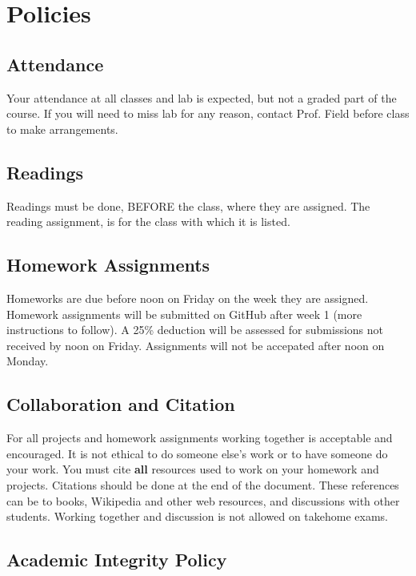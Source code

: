\documentclass[11pt]{article} %
\begin{document}
\section{Policies}

  \subsection{Attendance}
  
    Your attendance at all classes and lab is expected, but not a graded part of the course. If you will need to miss lab for any reason, contact Prof. Field before class to make arrangements.
  
  \subsection{Readings}
  
    Readings must be done, BEFORE the class, where they are assigned. 
    The reading assignment, is for the class with which it is listed. 
  
  \subsection{Homework Assignments}
  
    Homeworks are due before noon on Friday on the week they are assigned.
    Homework assignments will be submitted on GitHub after week 1 (more instructions to follow).
    A 25\% deduction will be assessed for submissions not received by noon on Friday. Assignments will not be accepated after noon on Monday.
  
  \subsection{Collaboration and Citation}
  
    For all projects and homework assignments working together is acceptable and encouraged. 
    It is not ethical to do someone else's work or to have someone do your work. 
    You must cite \textbf{all} resources used to work on your homework and projects. 
    Citations should be done at the end of the document. 
    These references can be to books, Wikipedia and other web resources, and discussions with other students. 
    Working together and discussion is not allowed on takehome exams.
  
  \subsection{Academic Integrity Policy}
  
\end{document}
